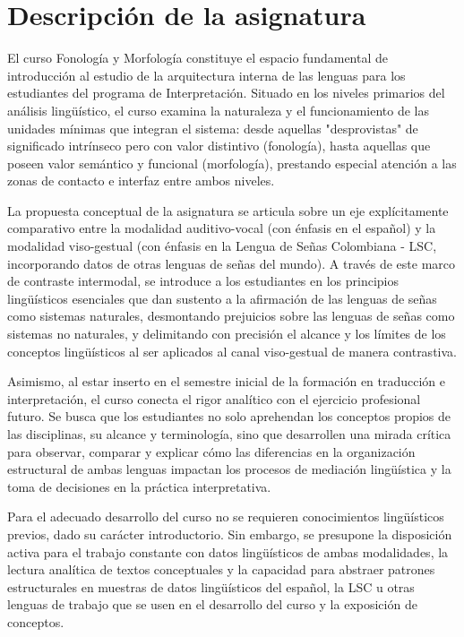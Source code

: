 
%

\section{Descripción de la asignatura}

El curso Fonología y Morfología constituye el espacio fundamental de introducción
al estudio de la arquitectura interna de las lenguas para los estudiantes del programa
de Interpretación. Situado en los niveles primarios del análisis lingüístico, el curso 
examina la naturaleza y el funcionamiento de las unidades mínimas que integran el sistema: 
desde aquellas "desprovistas" de significado intrínseco pero con valor distintivo (fonología),
hasta aquellas que poseen valor semántico y funcional (morfología), prestando especial atención 
a las zonas de contacto e interfaz entre ambos niveles.

La propuesta conceptual de la asignatura se articula sobre un eje explícitamente comparativo entre
la modalidad auditivo-vocal (con énfasis en el español) y la modalidad viso-gestual 
(con énfasis en la Lengua de Señas Colombiana - LSC, incorporando datos de otras lenguas de señas del mundo). 
A través de este marco de contraste intermodal, se introduce a los estudiantes en los principios lingüísticos 
esenciales que dan sustento a la afirmación de las lenguas de señas como sistemas naturales, desmontando prejuicios 
sobre las lenguas de señas como sistemas no naturales, y delimitando con precisión el alcance y los límites de los conceptos lingüísticos 
al ser aplicados al canal viso-gestual de manera contrastiva.

Asimismo, al estar inserto en el semestre inicial de la formación en traducción e interpretación, el curso conecta el rigor 
analítico con el ejercicio profesional futuro. Se busca que los estudiantes no solo aprehendan los conceptos propios de las 
disciplinas, su alcance y terminología, sino que desarrollen una mirada crítica para observar, comparar y explicar cómo las 
diferencias en la organización estructural de ambas lenguas impactan los procesos de mediación lingüística y la toma de 
decisiones en la práctica interpretativa.  

Para el adecuado desarrollo del curso no se requieren conocimientos lingüísticos previos, dado su carácter introductorio. 
Sin embargo, se presupone la disposición activa para el trabajo constante con datos lingüísticos de ambas modalidades, 
la lectura analítica de textos conceptuales y la capacidad para abstraer patrones estructurales en muestras de datos 
lingüísticos del español, la LSC u otras lenguas de trabajo que se usen en el desarrollo del curso y la exposición 
de conceptos.  